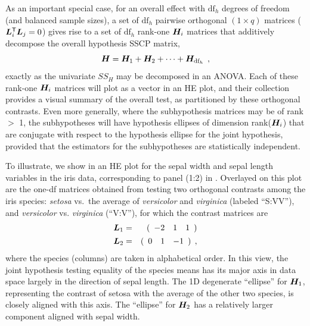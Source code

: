 As an important special case,
for an overall effect with
$\textrm{df}_h$ degrees of freedom (and balanced sample sizes), a set of $\textrm{df}_h$ pairwise orthogonal $(1 \times q)$
 matrices ($\bm{L}_i ^\mathsf{T} \bm{L}_j =0$) gives rise to a set of $\textrm{df}_h$ rank-one $\bm{H}_i$
matrices that additively decompose the overall hypothesis SSCP matrix,
\begin{equation*}
\bm{H} = \bm{H}_1 + \bm{H}_2 + \cdots + \bm{H}_{\textrm{df}_h}
\:\: ,
\end{equation*}
exactly as the univariate $SS_H$ may be decomposed in an ANOVA.  Each of these rank-one $\bm{H}_i$ matrices
will plot as a vector in an HE plot, and their collection provides a visual summary of the overall
test, as partitioned by these orthogonal contrasts.
Even more generally, where the subhypothesis matrices may be of rank $>$ 1,  the subhypotheses will have hypothesis ellipses of dimension rank($\bm{H}_i$)
that are conjugate with respect to the hypothesis ellipse for the joint hypothesis, provided that the
estimators for the subhypotheses are statistically independent.


To illustrate, we show in  an HE plot for the sepal width and sepal length variables in the iris data,
corresponding to panel (1:2) in . Overlayed on this plot are the
one-df  matrices obtained from testing two orthogonal contrasts among the iris species:
\emph{setosa} vs.\ the average of \emph{versicolor} and \emph{virginica} (labeled ``S:VV''), and \emph{versicolor} vs. \emph{virginica} (``V:V''), for which the contrast matrices are
\begin{eqnarray*}
\bm{L}_1 & = &
( \begin{array}{rrr}
-2 & 1 & 1
\end{array} )
\\
\bm{L}_2 & = &
( \begin{array}{rrr}
0 & 1 & -1
\end{array} ) \:\: ,
\end{eqnarray*}
where the species (columns) are taken in alphabetical order. In this view, the joint hypothesis testing
equality of the species means has its major axis in data space largely in the direction of sepal length.
The 1D degenerate ``ellipse'' for $\bm{H}_1$, representing the contrast of setosa with the average of the other two species,
is closely aligned with this axis. The ``ellipse'' for $\bm{H}_2$ has a relatively larger component aligned
with sepal width.

